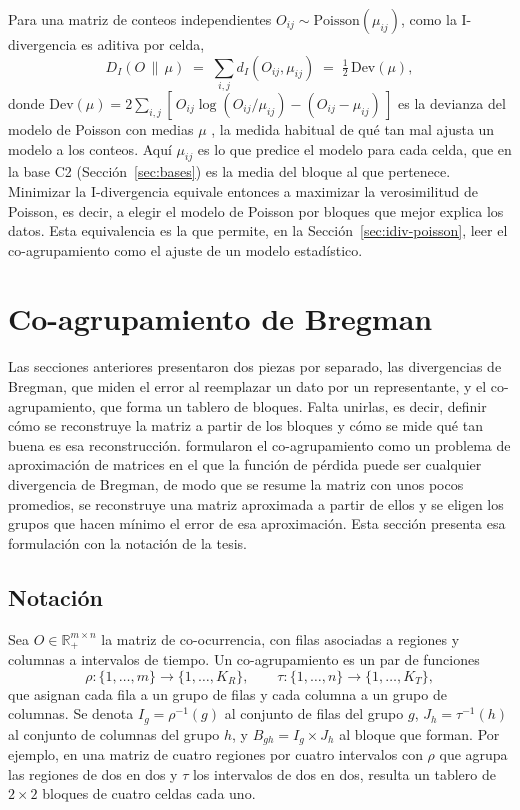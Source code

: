 Para una matriz de conteos independientes $O_{ij} \sim
\mathrm{Poisson}(\mu_{ij})$, como la I-divergencia es aditiva por celda,
\begin{equation}\label{eq:devianza}
  D_I(O \,\|\, \mu) \;=\; \sum_{i,j} d_I(O_{ij}, \mu_{ij}) \;=\; \tfrac{1}{2}\, \mathrm{Dev}(\mu),
\end{equation}
donde $\mathrm{Dev}(\mu) = 2 \sum_{i,j} [\, O_{ij} \log (O_{ij}/\mu_{ij}) - (O_{ij} - \mu_{ij}) \,]$
es la devianza del modelo de Poisson con medias $\mu$
\citep[Sec.~4.5.2, ec.~4.34]{Agresti2013}, la medida habitual de qué tan mal ajusta
un modelo a los conteos. Aquí $\mu_{ij}$ es lo que predice el modelo para cada
celda, que en la base C2 (Sección~\ref{sec:bases}) es la media del bloque al que pertenece. Minimizar la
I-divergencia equivale entonces a maximizar la verosimilitud de Poisson, es decir,
a elegir el modelo de Poisson por bloques que mejor explica los datos. Esta
equivalencia es la que permite, en la Sección~\ref{sec:idiv-poisson}, leer el
co-agrupamiento como el ajuste de un modelo estadístico.

\section{Co-agrupamiento de Bregman}\label{sec:bbac}

Las secciones anteriores presentaron dos piezas por separado, las divergencias de
Bregman, que miden el error al reemplazar un dato por un representante, y el
co-agrupamiento, que forma un tablero de bloques. Falta unirlas, es decir, definir
cómo se reconstruye la matriz a partir de los bloques y cómo se mide qué tan
buena es esa reconstrucción. \citet{Banerjee2007} formularon el co-agrupamiento
como un problema de aproximación de matrices en el que la función de pérdida
puede ser cualquier divergencia de Bregman, de modo que se resume la matriz con
unos pocos promedios, se reconstruye una matriz aproximada a partir de ellos y se
eligen los grupos que hacen mínimo el error de esa aproximación. Esta sección
presenta esa formulación con la notación de la tesis.

\subsection{Notación}

Sea $O \in \mathbb{R}_{+}^{m \times n}$ la matriz de co-ocurrencia, con filas
asociadas a regiones y columnas a intervalos de tiempo. Un co-agrupamiento es un
par de funciones
\[
  \rho : \{1, \dots, m\} \to \{1, \dots, K_R\}, \qquad
  \tau : \{1, \dots, n\} \to \{1, \dots, K_T\},
\]
que asignan cada fila a un grupo de filas y cada columna a un grupo de columnas.
Se denota $I_g = \rho^{-1}(g)$ al conjunto de filas del grupo $g$,
$J_h = \tau^{-1}(h)$ al conjunto de columnas del grupo $h$, y
$B_{gh} = I_g \times J_h$ al bloque que forman. Por ejemplo, en una matriz de
cuatro regiones por cuatro intervalos con $\rho$ que agrupa las regiones de dos
en dos y $\tau$ los intervalos de dos en dos, resulta un tablero de
$2 \times 2$ bloques de cuatro celdas cada uno.

